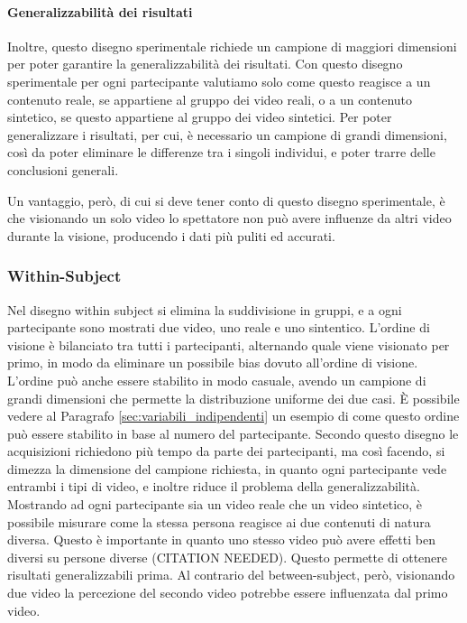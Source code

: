 \paragraph{Generalizzabilità dei risultati} Inoltre, questo disegno sperimentale richiede un campione di maggiori dimensioni per poter garantire la generalizzabilità dei risultati. Con questo disegno sperimentale per ogni partecipante valutiamo solo come questo reagisce a un contenuto reale, se appartiene al gruppo dei video reali, o a un contenuto sintetico, se questo appartiene al gruppo dei video sintetici. Per poter generalizzare i risultati, per cui, è necessario un campione di grandi dimensioni, così da poter eliminare le differenze tra i singoli individui, e poter trarre delle conclusioni generali.

Un vantaggio, però, di cui si deve tener conto di questo disegno sperimentale, è che visionando un solo video lo spettatore non può avere influenze da altri video durante la visione, producendo i dati più puliti ed accurati.

\subsubsection{Within-Subject}


Nel disegno within subject si elimina la suddivisione in gruppi, e a ogni partecipante sono mostrati due video, uno reale e uno sintentico. L'ordine di visione è bilanciato tra tutti i partecipanti, alternando quale viene visionato per primo, in modo da eliminare un possibile bias dovuto all'ordine di visione. L'ordine può anche essere stabilito in modo casuale, avendo un campione di grandi dimensioni che permette la distribuzione uniforme dei due casi. È possibile vedere al Paragrafo \ref{sec:variabili_indipendenti} un esempio di come questo ordine può essere stabilito in base al numero del partecipante. Secondo questo disegno le acquisizioni richiedono più tempo da parte dei partecipanti, ma così facendo, si dimezza la dimensione del campione richiesta, in quanto ogni partecipante vede entrambi i tipi di video, e inoltre riduce il problema della generalizzabilità. Mostrando ad ogni partecipante sia un video reale che un video sintetico, è possibile misurare come la stessa persona reagisce ai due contenuti di natura diversa. Questo è importante in quanto uno stesso video può avere effetti ben diversi su persone diverse (CITATION NEEDED). Questo permette di ottenere risultati generalizzabili prima. Al contrario del between-subject, però, visionando due video la percezione del secondo video potrebbe essere influenzata dal primo video.
